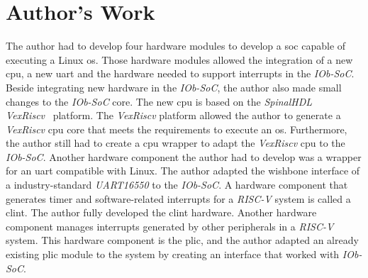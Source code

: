 \section{Author's Work}
\label{section:authors_work}
The author had to develop four hardware modules to develop a \acrfull{soc} capable of executing a Linux \acrshort{os}. Those hardware modules allowed the integration of a new \acrshort{cpu}, a new \acrshort{uart} and the hardware needed to support interrupts in the \textit{IOb-SoC}. Beside integrating new hardware in the \textit{IOb-SoC}, the author also made small changes to the \textit{IOb-SoC} core. The new \acrshort{cpu} is based on the \textit{SpinalHDL}~\cite{papon2017spinalhdl} \textit{VexRiscv}~\cite{vexriscv} platform. The \textit{VexRiscv} platform allowed the author to generate a \textit{VexRiscv} \acrshort{cpu} core that meets the requirements to execute an \acrlong{os}. Furthermore, the author still had to create a \acrshort{cpu} wrapper to adapt the \textit{VexRiscv} \acrshort{cpu} to the \textit{IOb-SoC}. Another hardware component the author had to develop was a wrapper for an \acrshort{uart} compatible with Linux. The author adapted the wishbone interface of a industry-standard \textit{UART16550} to the \textit{IOb-SoC}. A hardware component that generates timer and software-related interrupts for a \textit{RISC-V} system is called a \acrshort{clint}. The author fully developed the \acrshort{clint} hardware. Another hardware component manages interrupts generated by other peripherals in a \textit{RISC-V} system. This hardware component is the \acrshort{plic}, and the author adapted an already existing \acrshort{plic} module to the system by creating an interface that worked with \textit{IOb-SoC}.


